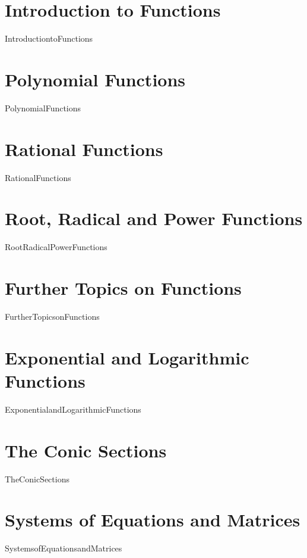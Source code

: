 \documentclass[11pt]{book}
\theoremstyle{definition}  %
\begin{document}
\mainmatter
 
\renewcommand{\chaptername}{Chapter}


\chapter{Introduction to Functions}
\label{IntroductiontoFunctions}
\thispagestyle{empty}
{IntroductiontoFunctions}

\chapter{Polynomial Functions}
\label{PolynomialFunctions}
\thispagestyle{empty}
{PolynomialFunctions}

\chapter{Rational Functions}
\label{RationalFunctions}
\thispagestyle{empty}
{RationalFunctions}


\chapter{Root, Radical and Power Functions}
\label{RootRadicalPowerFunctions}
\thispagestyle{empty}
{RootRadicalPowerFunctions}

\chapter{Further Topics on Functions}
\label{FurtherTopicsonFunctions}
\thispagestyle{empty}
{FurtherTopicsonFunctions}

\chapter{Exponential and Logarithmic Functions}
\label{ExponentialandLogarithmicFunctions}
\thispagestyle{empty}
{ExponentialandLogarithmicFunctions}

\chapter{The Conic Sections}
\label{TheConicSections}
\thispagestyle{empty}
{TheConicSections}

\chapter{Systems of Equations and Matrices}
\label{SystemsofEquationsandMatrices}
\thispagestyle{empty}
{SystemsofEquationsandMatrices}
\end{document}
